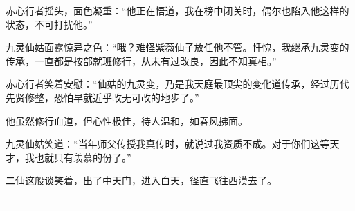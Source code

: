 \begin{this_body}
赤心行者摇头，面色凝重：“他正在悟道，我在榜中闭关时，偶尔也陷入他这样的状态，不可打扰他。”

九灵仙姑面露惊异之色：“哦？难怪紫薇仙子放任他不管。忏愧，我继承九灵变的传承，一直都是按部就班修行，从未有过改良，因此不知真相。”

赤心行者笑着安慰：“仙姑的九灵变，乃是我天庭最顶尖的变化道传承，经过历代先贤修整，恐怕早就近乎改无可改的地步了。”

他虽然修行血道，但心性极佳，待人温和，如春风拂面。

九灵仙姑笑道：“当年师父传授我真传时，就说过我资质不成。对于你们这等天才，我也就只有羡慕的份了。”

二仙这般谈笑着，出了中天门，进入白天，径直飞往西漠去了。

------------

\end{this_body}

